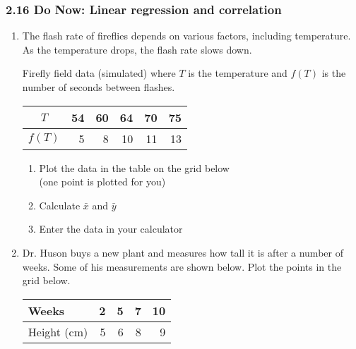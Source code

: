 \documentclass[12pt, twoside]{article}
\begin{document}
\subsubsection*{2.16 Do Now: Linear regression and correlation}
\begin{enumerate}
 
  \item The flash rate of fireflies depends on various factors, including temperature. As the temperature drops, the flash rate slows down.
  
  Firefly field data (simulated) where $T$ is the temperature and $f(T)$ is the number of seconds between flashes. \\[10pt]
  \begin{tabular}{|c|r|r|r|r|r|}
  \hline
  $T$ & 54 & 60 & 64 & 70 & 75 \\ [3pt]
  \hline
  $f(T)$ & 5 & 8 & 10 & 11 & 13  \\  [3pt]
  \hline
  \end{tabular}
  \begin{enumerate}
      \item Plot the data in the table on the grid below \\
      (one point is plotted for you)
      \item Calculate $\bar{x}$ and $\bar{y}$
      \item Enter the data in your calculator
  \end{enumerate} \vspace{1in}
  
\newpage
\item Dr. Huson buys a new plant and measures how tall it is after a number of weeks. Some of his measurements are shown below. Plot the points in the grid below.
  \renewcommand{\arraystretch}{1.6}
    \begin{center}
      \begin{tabular}{|l|r|r|r|r|}
      \hline
      Weeks & 2 & 5 & 7 & 10\\
      \hline
      Height (cm) & 5 & 6 & 8 & 9 \\
      \hline
      \end{tabular}
    \end{center}


\end{enumerate}
\end{document}
